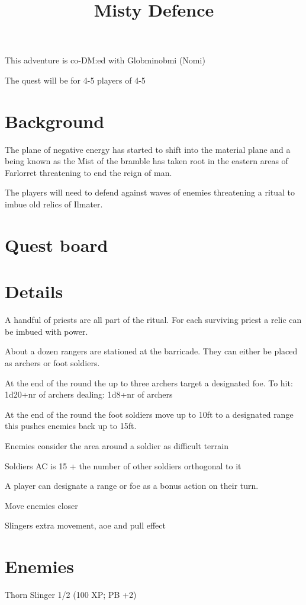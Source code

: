 \documentclass{article}
\title{Misty Defence}
\begin{document}
    This adventure is co-DM:ed with Globminobmi (Nomi)

    The quest will be for 4-5 players of 4-5 

    \section{Background}

    The plane of negative energy has started to shift into the material plane and a being known as the Mist of the bramble has taken root in the eastern areas of Farlorret threatening to end the reign of man.

    The players will need to defend against waves of enemies threatening a ritual to imbue old relics of Ilmater. 

    \section{Quest board}


    \section{Details}

    A handful of priests are all part of the ritual. For each surviving priest a relic can be imbued with power. 

    About a dozen rangers are stationed at the barricade. They can either be placed as archers or foot soldiers.

    At the end of the round the up to three archers target a designated foe. To hit: 1d20+nr of archers dealing: 1d8+nr of archers

    At the end of the round the foot soldiers move up to 10ft to a designated range this pushes enemies back up to 15ft. 

    Enemies consider the area around a soldier as difficult terrain

    Soldiers AC is 15 + the number of other soldiers orthogonal to it

    A player can designate a range or foe as a bonus action on their turn.


    Move enemies closer

    Slingers extra movement, aoe and pull effect

    \section{Enemies}
    Thorn Slinger 1/2 (100 XP; PB +2)
    
\end{document}
